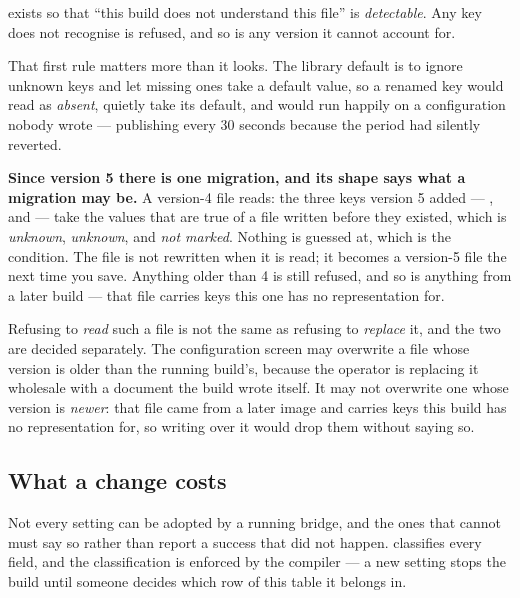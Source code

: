  exists so that ``this build does not understand this file'' is
\emph{detectable}. Any key \prog does not recognise is refused, and so is any version it
cannot account for.

That first rule matters more than it looks. The library default is to ignore unknown keys
and let missing ones take a default value, so a renamed key would read as \emph{absent},
quietly take its default, and \prog would run happily on a configuration nobody wrote ---
publishing every 30 seconds because the period had silently reverted.

\textbf{Since version 5 there is one migration, and its shape says what a migration may be.}
A version-4 file reads: the three keys version 5 added --- ,
 and  --- take the values that are true of a file
written before they existed, which is \emph{unknown}, \emph{unknown}, and \emph{not
marked}. Nothing is guessed at, which is the condition. The file is not rewritten when it is
read; it becomes a version-5 file the next time you save. Anything older than 4 is still
refused, and so is anything from a later build --- that file carries keys this one has no
representation for.

Refusing to \emph{read} such a file is not the same as refusing to \emph{replace} it, and the
two are decided separately. The configuration screen may overwrite a file whose version is
older than the running build's, because the operator is replacing it wholesale with a document
the build wrote itself. It may not overwrite one whose version is \emph{newer}: that file came
from a later image and carries keys this build has no representation for, so writing over it
would drop them without saying so.

\subsection{What a change costs}
\label{sec:changecost}

Not every setting can be adopted by a running bridge, and the ones that cannot must say so
rather than report a success that did not happen. \prog classifies every field, and the
classification is enforced by the compiler --- a new setting stops the build until someone
decides which row of this table it belongs in.

